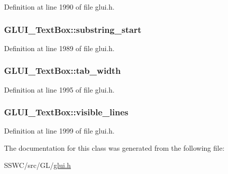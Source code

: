 Definition at line 1990 of file glui.\+h.

\hypertarget{class_g_l_u_i___text_box_a3607ee96b4b08fdbe40f2ae9f7b7e329}{
\subsubsection[{substring\+\_\+start}]{ G\+L\+U\+I\+\_\+\+Text\+Box\+::substring\+\_\+start}}\label{class_g_l_u_i___text_box_a3607ee96b4b08fdbe40f2ae9f7b7e329}


Definition at line 1989 of file glui.\+h.

\hypertarget{class_g_l_u_i___text_box_a662a6e35456ef73e0a1f05be51327fa6}{
\subsubsection[{tab\+\_\+width}]{ G\+L\+U\+I\+\_\+\+Text\+Box\+::tab\+\_\+width}}\label{class_g_l_u_i___text_box_a662a6e35456ef73e0a1f05be51327fa6}


Definition at line 1995 of file glui.\+h.

\hypertarget{class_g_l_u_i___text_box_a6325bbadbe462f57a1a05c66c545095f}{
\subsubsection[{visible\+\_\+lines}]{ G\+L\+U\+I\+\_\+\+Text\+Box\+::visible\+\_\+lines}}\label{class_g_l_u_i___text_box_a6325bbadbe462f57a1a05c66c545095f}


Definition at line 1999 of file glui.\+h.



The documentation for this class was generated from the following file\+:\begin{DoxyCompactItemize}
\item 
S\+S\+W\+C/src/\+G\+L/\hyperlink{glui_8h}{glui.\+h}\end{DoxyCompactItemize}
